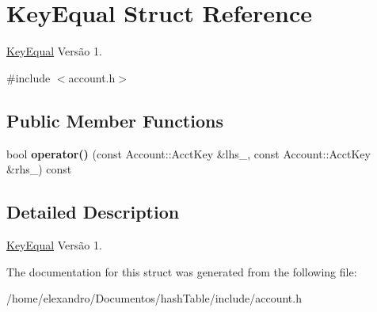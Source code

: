 \hypertarget{struct_key_equal}{}\section{Key\+Equal Struct Reference}
\label{struct_key_equal}


\hyperlink{struct_key_equal}{Key\+Equal} Versão 1.  




{\ttfamily \#include $<$account.\+h$>$}

\subsection*{Public Member Functions}
\begin{DoxyCompactItemize}
\item 
\mbox{\label{struct_key_equal_a7ef5a1becbc4a232e0db4593e794e323}} 
bool {\bfseries operator()} (const Account\+::\+Acct\+Key \&lhs\+\_\+, const Account\+::\+Acct\+Key \&rhs\+\_\+) const
\end{DoxyCompactItemize}


\subsection{Detailed Description}
\hyperlink{struct_key_equal}{Key\+Equal} Versão 1. 

The documentation for this struct was generated from the following file\+:\begin{DoxyCompactItemize}
\item 
/home/elexandro/\+Documentos/hash\+Table/include/account.\+h\end{DoxyCompactItemize}
